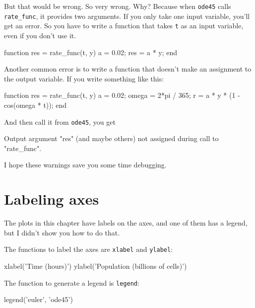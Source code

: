 \documentclass[
]{book}
\numberwithin{Answer}{chapter}
\numberwithin{Exercise}{chapter}
\begin{document}
But that would be wrong.  So very wrong.  Why?  Because
when {\tt ode45} calls {\tt rate\_func}, it provides two arguments.
If you only take one input variable, you'll get an error.  So
you have to write a function that takes {\tt t} as an input
variable, even if you don't use it.


\begin{code}
function res = rate_func(t, y)     %
    a = 0.02;
    res = a * y;
end
\end{code}

Another common error is to write a function that doesn't make
an assignment to the output variable.  If you write something
like this:

\begin{code}
function res = rate_func(t, y)
    a = 0.02;
    omega = 2*pi / 365;
    r = a * y * (1 - cos(omega * t));    %
end
\end{code}

And then call it from {\tt ode45}, you get

\begin{code}
Output argument "res" (and maybe others) not assigned during call
to "rate_func".
\end{code}

I hope these warnings save you some time debugging.


\section{Labeling axes}

The plots in this chapter have labels on the axes, and one of them has a legend, but I didn't show you how to do that.


The functions to label the axes are {\tt xlabel} and {\tt ylabel}:

\begin{code}
xlabel('Time (hours)')
ylabel('Population (billions of cells)')
\end{code}

The function to generate a legend is {\tt legend}:

\begin{code}
legend('euler', 'ode45')
\end{code}

\end{document}
